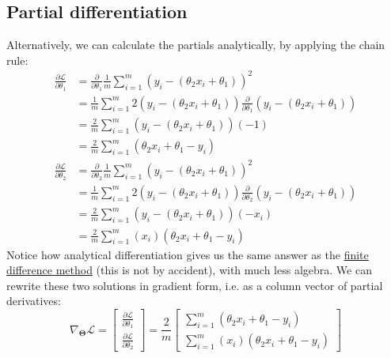 %

\subsection{Partial differentiation}

\noindent Alternatively, we can calculate the partials analytically, by applying the chain rule:
%
\begin{align}
\frac{\partial\mathcal{L}}{\partial \theta_1} & = \frac{\partial}{\partial \theta_1}\frac{1}{m}\sum_{i=1}^m(y_i - (\theta_2 x_i + \theta_1))^2 \\ & = \frac{1}{m}\sum_{i=1}^m 2 (y_i - (\theta_2 x_i + \theta_1))\frac{\partial}{\partial \theta_1}(y_i - (\theta_2 x_i + \theta_1)) \\ & = \frac{2}{m}\sum_{i=1}^m(y_i - (\theta_2 x_i + \theta_1))(-1) \\ & = \boxed{\frac{2}{m}\sum_{i=1}^m(\theta_2 x_i + \theta_1 - y_i)}
\end{align}
%
\begin{align}
\frac{\partial\mathcal{L}}{\partial \theta_2} & = \frac{\partial}{\partial \theta_2}\frac{1}{m}\sum_{i=1}^m(y_i - (\theta_2 x_i + \theta_1))^2 \\ & = \frac{1}{m}\sum_{i=1}^m 2(y_i - (\theta_2 x_i + \theta_1)) \frac{\partial}{\partial \theta_2}(y_i - (\theta_2 x_i + \theta_1)) \\ & = \frac{2}{m}\sum_{i=1}^m(y_i - (\theta_2 x_i + \theta_1))(-x_i) \\ & = \boxed{\frac{2}{m}\sum_{i=1}^m(x_i)(\theta_2 x_i + \theta_1 - y_i)}
\end{align}
%
Notice how analytical differentiation gives us the same answer as the \hyperref[sec:fdm]{finite difference method} (this is not by accident), with much less algebra. We can rewrite these two solutions in gradient form, i.e. as a column vector of partial derivatives:
%
\begin{equation}
\nabla_{\bm\Theta}\mathcal{L} =
\begin{bmatrix}
\frac{\partial\mathcal{L}}{\partial \theta_1} \\
\frac{\partial\mathcal{L}}{\partial \theta_2}
\end{bmatrix} = \frac{2}{m}
\begin{bmatrix}
\sum_{i=1}^m(\theta_2 x_i + \theta_1 - y_i) \\ \sum_{i=1}^m(x_i)(\theta_2 x_i + \theta_1 - y_i)
\end{bmatrix}
\end{equation}

